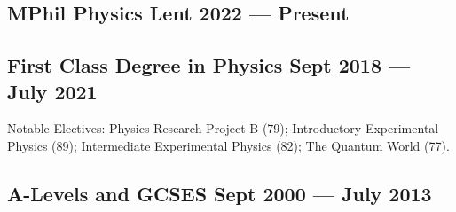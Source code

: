 \subsection{{MPhil Physics \hfill Lent 2022 --- Present}}
\begin{zitemize}
\vspace{7px}
\end{zitemize}
\subsection{{First Class Degree in Physics \hfill Sept 2018 --- July 2021}}

\begin{zitemize} 
\item Notable Electives: Physics Research Project B (79); Introductory Experimental Physics
(89); Intermediate Experimental Physics (82); The Quantum World (77).
\end{zitemize}

\subsection{{A-Levels and GCSES  \hfill Sept 2000 --- July 2013}}
\vspace{5px}

